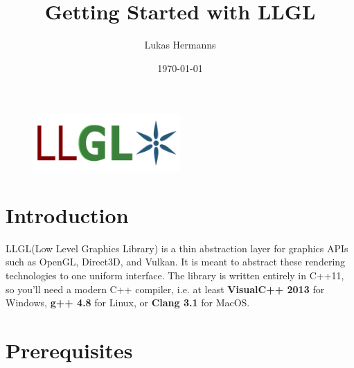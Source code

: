 \documentclass{article}
\title{Getting Started with LLGL}
\author{Lukas Hermanns}
\date{\today}
\begin{document}

\def\LLGL{\textcolor{darkBlueColor}{LLGL}\xspace}


\maketitle



\begin{figure}[ht]
	\centering
	\includegraphics[width=0.5\textwidth]{../LLGL_Logo.pdf}
\end{figure}

\section*{Introduction}

\LLGL (Low Level Graphics Library) is a thin abstraction layer for graphics APIs such as
OpenGL, Direct3D, and Vulkan. It is meant to abstract these rendering technologies to one uniform interface.
The library is written entirely in C++11, so you'll
need a modern C++ compiler, i.e. at least \textbf{VisualC++ 2013} for Windows,
\textbf{g++ 4.8} for Linux, or \textbf{Clang 3.1} for MacOS.



\section*{Prerequisites}
\end{document}

